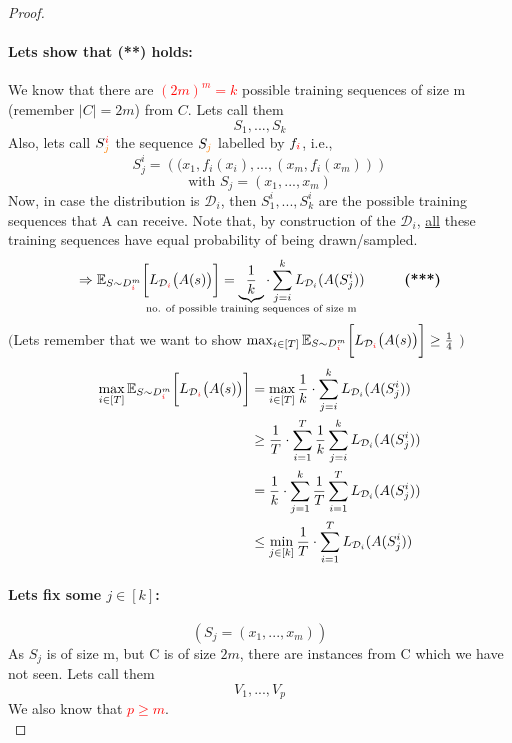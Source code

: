 \documentclass[10pt,a4paper]{article}
\theoremstyle{definition}
\theoremstyle{plain}
\begin{document}
\begin{proof}
	\paragraph{Lets show that (**) holds:} We know that there are \textcolor{red}{$(2m)^m = k$} possible training sequences of size m (remember $|C| = 2m$) from $C$. Lets call them
	$$ S_1, ..., S_k $$
	Also, lets call $S_{\textcolor{orange}{j}}^{\textcolor{red}{i}}$ the sequence $S_{\textcolor{orange}{j}}$ labelled by $f_{\textcolor{red}{i}}$, i.e.,
	$$
		S_j^i = \left((x_1, f_i(x_i), ..., (x_m, f_i(x_m))\right)
	$$ 
	$$
		\text{with } S_j = (x_1, ..., x_m)
	$$
	Now, in case the distribution is $\mathcal{D}_i$, then $S_1^i, ..., S_k^i$ are the possible training sequences that A can receive. Note that, by construction of the $\mathcal{D}_i$, \underline{all} these training sequences have equal probability of being drawn/sampled.
	$$
		\Rightarrow\mathbb{E}_{S \sim D^{m}_{\textcolor{red}{i}}}\bigg[L_{\mathcal{D}_{\textcolor{red}{i}}}\big(A(s)\big)\bigg] = \underbrace{\frac{1}{k}}_{\mathclap{  \text{no. of possible training sequences of size m}}} \cdot \sum_{j = i}^{k} L_{\mathcal{D}_i}(A(S_{j}^{i})) \hspace{1cm} \text{\textbf{(***)}}
	$$ 
	$\Big($Lets remember that we want to show
	$
		\max_{i \in [T]} \mathbb{E}_{S \sim D^{m}_{\textcolor{red}{i}}}\bigg[L_{\mathcal{D}_{\textcolor{red}{i}}}\big(A(s)\big)\bigg] \geq \frac{1}{4}
	$ $\Big)$
	\begin{align*}
		\max_{i \in [T]} \mathbb{E}_{S \sim D^{m}_{\textcolor{red}{i}}}\bigg[L_{\mathcal{D}_{\textcolor{red}{i}}}\big(A(s)\big)\bigg] &= \max_{i \in [T]} \frac{1}{k} \cdot \sum_{j = i}^{k} L_{\mathcal{D}_i}(A(S_{j}^{i}))  \\
		&\geq \frac{1}{T} \cdot \sum_{i=1}^{T} \frac{1}{k} \sum_{j = i}^{k} L_{\mathcal{D}_i}(A(S_j^i)) \\
		&= \frac{1}{k} \cdot \sum_{j=1}^{k} \frac{1}{T} \sum_{i = 1}^{T} L_{\mathcal{D}_i}(A(S_j^i))\\
		&\leq \min_{j \in [k]} \frac{1}{T} \cdot \sum_{i = 1}^{T} L_{\mathcal{D}_i}(A(S_j^i))
	\end{align*}
	\paragraph{Lets fix some $j \in [k]$:}
	$$(S_j = (x_1, ..., x_m))$$
	As $S_j$ is of size m, but C is of size $2m$, there are instances from C which we have not seen. Lets call them 
	$$ V_1, ..., V_p$$
	We also know that \textcolor{red}{$p \geq m$}.\\
	

\end{proof}
\end{document}
